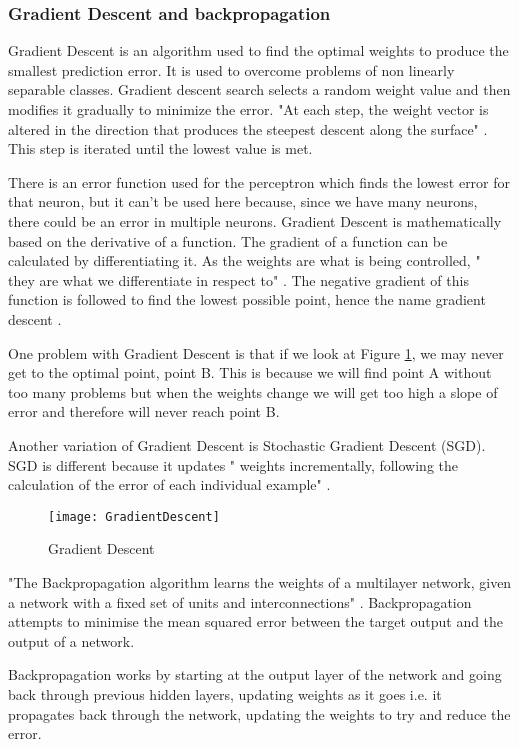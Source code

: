 \subsubsection*{Gradient Descent and backpropagation}
Gradient Descent is an algorithm used to find the optimal weights to produce the
smallest prediction error. It is used to overcome problems of non linearly
separable classes. Gradient descent search selects a random weight value and
then modifies it gradually to minimize the error. "At each step, the weight
vector is altered in the direction that produces the steepest descent along the
surface" \parencite{MLANN}. This step is iterated until the lowest value is met.

There is an error function used for the perceptron which finds the lowest error for that neuron, but it can't be used here because, since we have many neurons, there could be an error in multiple neurons.
Gradient Descent is mathematically based on the derivative of a function.
The gradient of a function can be calculated by differentiating it.
As the weights are what is being controlled, " they are what we differentiate in respect to" \parencite{MLAlgorithm}.
The negative gradient of this function is followed to find the lowest possible point, hence the name gradient descent \parencite{MLAlgorithm}.

One problem with Gradient Descent is that if we look at Figure \ref{fig:GD}, we may
never get to the optimal point, point B. This is because we will find point A
without too many problems but when the weights change we will get too high a
slope of error and therefore will never reach point B.

Another variation of Gradient Descent is Stochastic Gradient Descent (SGD). SGD
is different because it updates " weights incrementally, following the
calculation of the error of each individual example" \parencite{MLANN}. 

\begin{figure}[h]
      \texttt{[image: GradientDescent]}
      \caption{Gradient Descent}
      \label{fig:GD}
 \end{figure}

"The Backpropagation algorithm learns the weights of a multilayer network,
given a network with a fixed set of units and interconnections" \parencite{MLANN}.
Backpropagation attempts to minimise the mean squared error between the target
output and the output of a network.

Backpropagation works by starting at the output layer of the network and going
back through previous hidden layers, updating weights as it goes i.e. it propagates back through the network, updating the weights to try and reduce the error.

